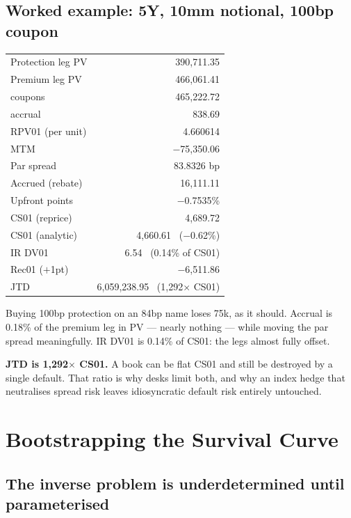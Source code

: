 \documentclass[11pt,a4paper]{article}
\newcommand{\keypoint}[1]{%
  \par\vspace{0.4em}\noindent
  \colorbox{codebg}{\parbox{\dimexpr\linewidth-2\fboxsep}{\small #1}}%
  \par\vspace{0.5em}}
\begin{document}
\subsection{Worked example: 5Y, 10mm notional, 100bp coupon}

\begin{center}
\begin{tabular}{lr}
\toprule
Protection leg PV & 390,711.35 \\
Premium leg PV & 466,061.41 \\
\quad coupons & 465,222.72 \\
\quad accrual & 838.69 \\
RPV01 (per unit) & 4.660614 \\
MTM & $-$75,350.06 \\
Par spread & 83.8326 bp \\
Accrued (rebate) & 16,111.11 \\
Upfront points & $-$0.7535\% \\
\midrule
CS01 (reprice) & 4,689.72 \\
CS01 (analytic) & 4,660.61 \ ($-$0.62\%) \\
IR DV01 & 6.54 \ (0.14\% of CS01) \\
Rec01 ($+$1pt) & $-$6,511.86 \\
JTD & 6,059,238.95 \ (1,292$\times$ CS01) \\
\bottomrule
\end{tabular}
\end{center}

Buying 100bp protection on an 84bp name loses 75k, as it should. Accrual is 0.18\% of the
premium leg in PV --- nearly nothing --- while moving the par spread meaningfully. IR DV01 is
0.14\% of CS01: the legs almost fully offset.

\keypoint{\textbf{JTD is 1,292$\times$ CS01.} A book can be flat CS01 and still be destroyed
by a single default. That ratio is why desks limit both, and why an index hedge that
neutralises spread risk leaves idiosyncratic default risk entirely untouched.}

\newpage
\section{Bootstrapping the Survival Curve}

\subsection{The inverse problem is underdetermined until parameterised}
\end{document}
